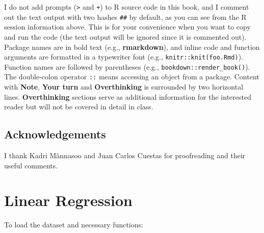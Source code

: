 \documentclass[]{book}
\begin{document}
I do not add prompts (\texttt{\textgreater{}} and \texttt{+}) to R source code in this book, and I comment out the text output with two hashes \texttt{\#\#} by default, as you can see from the R session information above. This is for your convenience when you want to copy and run the code (the text output will be ignored since it is commented out). Package names are in bold text (e.g., \textbf{rmarkdown}), and inline code and function arguments are formatted in a typewriter font (e.g., \texttt{knitr::knit(\textquotesingle{}foo.Rmd\textquotesingle{})}). Function names are followed by parentheses (e.g., \texttt{bookdown::render\_book()}). The double-colon operator \texttt{::} means accessing an object from a package.
Content with \textbf{Note}, \textbf{Your turn} and \textbf{Overthinking} is surrounded by two horizontal lines. \textbf{Overthinking} sections serve as additional information for the interested reader but will not be covered in detail in class.

\hypertarget{acknowledgements}{%
\section*{Acknowledgements}\label{acknowledgements}}

I thank Kadri Männasoo and Juan Carlos Cuestas for proofreading and their useful comments.

\hypertarget{linearregression}{%
\chapter{Linear Regression}\label{linearregression}}

To load the dataset and necessary functions:
\end{document}
